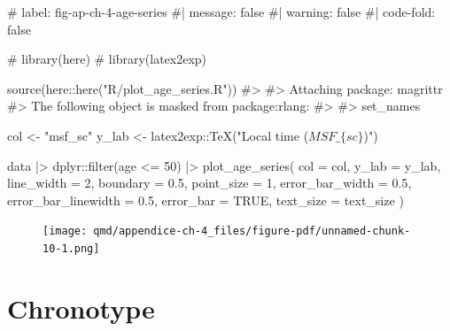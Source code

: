 \documentclass[
  12pt,
  a4paper,
  oneside]{tesesusp}
\newenvironment{Shaded}{\begin{snugshade}}{\end{snugshade}}
\newcommand{\AttributeTok}[1]{\textcolor[rgb]{0.40,0.45,0.13}{#1}}
\newcommand{\CommentTok}[1]{\textcolor[rgb]{0.37,0.37,0.37}{#1}}
\newcommand{\ConstantTok}[1]{\textcolor[rgb]{0.56,0.35,0.01}{#1}}
\newcommand{\DecValTok}[1]{\textcolor[rgb]{0.68,0.00,0.00}{#1}}
\newcommand{\FloatTok}[1]{\textcolor[rgb]{0.68,0.00,0.00}{#1}}
\newcommand{\FunctionTok}[1]{\textcolor[rgb]{0.28,0.35,0.67}{#1}}
\newcommand{\NormalTok}[1]{\textcolor[rgb]{0.00,0.23,0.31}{#1}}
\newcommand{\OtherTok}[1]{\textcolor[rgb]{0.00,0.23,0.31}{#1}}
\newcommand{\SpecialCharTok}[1]{\textcolor[rgb]{0.37,0.37,0.37}{#1}}
\newcommand{\StringTok}[1]{\textcolor[rgb]{0.13,0.47,0.30}{#1}}
\begin{document}
\begin{Shaded}
\begin{Highlighting}[numbers=left,,]
\CommentTok{\# label: fig{-}ap{-}ch{-}4{-}age{-}series}
\CommentTok{\#| message: false}
\CommentTok{\#| warning: false}
\CommentTok{\#| code{-}fold: false}

\CommentTok{\# library(here)}
\CommentTok{\# library(latex2exp)}

\FunctionTok{source}\NormalTok{(here}\SpecialCharTok{::}\FunctionTok{here}\NormalTok{(}\StringTok{"R/plot\_age\_series.R"}\NormalTok{))}
\CommentTok{\#\textgreater{} }
\CommentTok{\#\textgreater{} Attaching package: \textquotesingle{}magrittr\textquotesingle{}}
\CommentTok{\#\textgreater{} The following object is masked from \textquotesingle{}package:rlang\textquotesingle{}:}
\CommentTok{\#\textgreater{} }
\CommentTok{\#\textgreater{}     set\_names}

\NormalTok{col }\OtherTok{\textless{}{-}} \StringTok{"msf\_sc"}
\NormalTok{y\_lab }\OtherTok{\textless{}{-}}\NormalTok{ latex2exp}\SpecialCharTok{::}\FunctionTok{TeX}\NormalTok{(}\StringTok{"Local time ($MSF\_\{sc\}$)"}\NormalTok{)}

\NormalTok{data }\SpecialCharTok{|\textgreater{}}
\NormalTok{  dplyr}\SpecialCharTok{::}\FunctionTok{filter}\NormalTok{(age }\SpecialCharTok{\textless{}=} \DecValTok{50}\NormalTok{) }\SpecialCharTok{|\textgreater{}}
  \FunctionTok{plot\_age\_series}\NormalTok{(}
    \AttributeTok{col =}\NormalTok{ col, }
    \AttributeTok{y\_lab =}\NormalTok{ y\_lab, }
    \AttributeTok{line\_width =} \DecValTok{2}\NormalTok{, }
    \AttributeTok{boundary =} \FloatTok{0.5}\NormalTok{, }
    \AttributeTok{point\_size =} \DecValTok{1}\NormalTok{,}
    \AttributeTok{error\_bar\_width =} \FloatTok{0.5}\NormalTok{, }
    \AttributeTok{error\_bar\_linewidth =} \FloatTok{0.5}\NormalTok{, }
    \AttributeTok{error\_bar =} \ConstantTok{TRUE}\NormalTok{,}
    \AttributeTok{text\_size =}\NormalTok{ text\_size}
\NormalTok{    )}
\end{Highlighting}
\end{Shaded}

\begin{figure}[H]

{\centering \texttt{[image: qmd/appendice-ch-4\_files/figure-pdf/unnamed-chunk-10-1.png]}

}

\end{figure}

\hypertarget{chronotype}{%
\section{Chronotype}\label{chronotype}}
\end{document}
